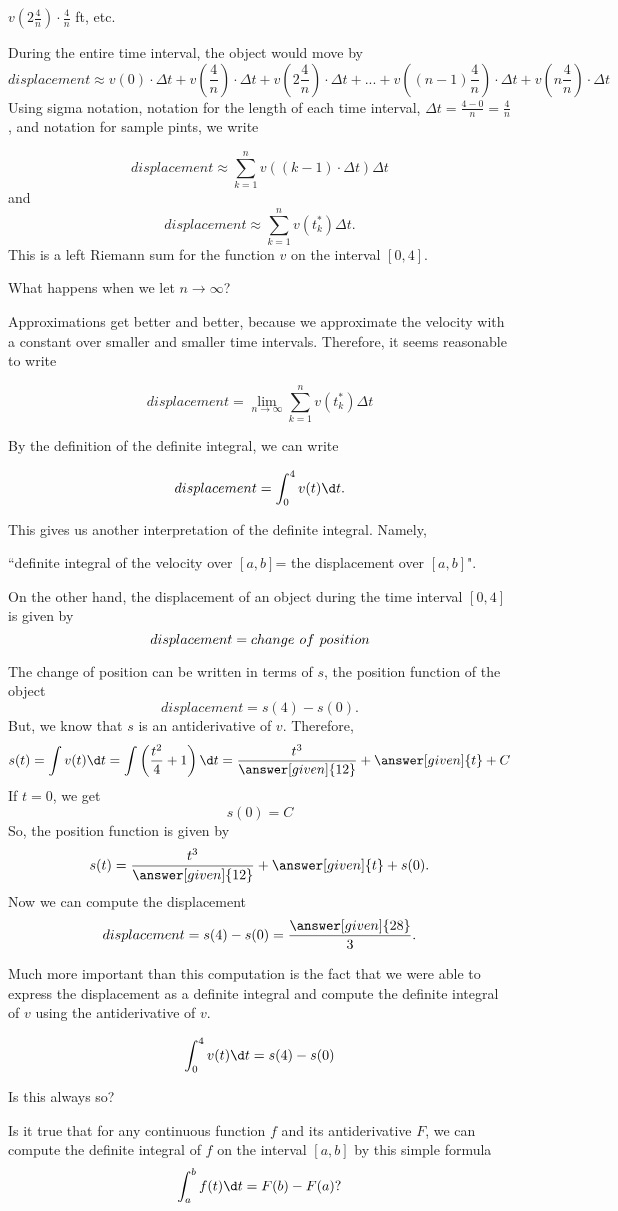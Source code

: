 \documentclass{ximera}
\begin{document}
\begin{example}
\begin{explanation}
 $v\left(2\frac{4}{n}\right)\cdot\frac{4}{n}$ ft, etc. 
 
 During the entire time interval, the object would move by
\[
   displacement \approx v(0)\cdot\Delta t+v\left(\frac{4}{n}\right)\cdot\Delta t+v\left(2\frac{4}{n}\right)\cdot\Delta t+...+v\left((n-1)\frac{4}{n}\right)\cdot\Delta t+v\left(n\frac{4}{n}\right)\cdot\Delta t
\]
Using sigma notation, notation for  the length of each time interval, $\Delta t=\frac{4-0}{n}=\frac{4}{n}$, and notation for sample pints, we write 

  \[
   displacement\approx \sum_{k=1}^nv((k-1)\cdot\Delta t)\Delta t
\]
and
\[
   displacement\approx \sum_{k=1}^nv(t_{k}^*)\Delta t.
  \]
  This is a left Riemann sum for the function $v$ on the interval $[0,4]$.
  
  
What happens when we let $n\to\infty$?

Approximations get better and better, because we approximate the velocity with a constant over smaller and smaller time intervals.
Therefore, it seems reasonable to  write

  \[
   displacement=\lim_{n\to\infty}\sum_{k=1}^nv(t_k^*)\Delta t
\]

By  the definition of the definite integral, we can write


  \[
   displacement=\int_{0}^{4}v(t)\d t.
\]

This gives us another interpretation of the definite integral. Namely,



``definite integral of the velocity over $[a,b]$= the displacement over $[a,b]$".



  On the other hand, the displacement of an object during the time interval $[0,4]$ is given by
  \[
   displacement=change\hspace{0.05in} of\hspace{0.05in} position
\]
  
  The change of position can be written in terms of $s$, the position function of the object
  \[
   displacement=s(4)-s(0).
\]
But, we know that $s$ is an antiderivative of $v$. Therefore,
 \[
  s(t)=\int v(t)\d t=\int\left(\frac{t^2}{4}+1\right)\d t=\frac{t^3}{\answer[given]{12}}+\answer[given]{t}+C
\]
If $t=0$, we get
 \[
  s(0)=C
\]
So, the position function is given by
\[
  s(t)=\frac{t^3}{\answer[given]{12}}+\answer[given]{t}+s(0).
\]
Now we can compute the displacement
 \[
   displacement=s(4)-s(0)=\frac{\answer[given]{28}}{3}.
\]
  \end{explanation}
  
Much more important than this computation is the fact that we were able to express the displacement as a definite integral and  compute the definite integral  of $v$ using the antiderivative of $v$.

 \[
   \int_{0}^{4}v(t)\d t=s(4)-s(0)
\]

Is this always so?

Is it true that for any continuous function $f$ and its antiderivative $F$, we can compute the definite integral of $f$ on the interval $[a,b]$ by this simple formula
\[
   \int_{a}^{b}f(t)\d t=F(b)-F(a)?
\]

\end{example}
\end{document}
